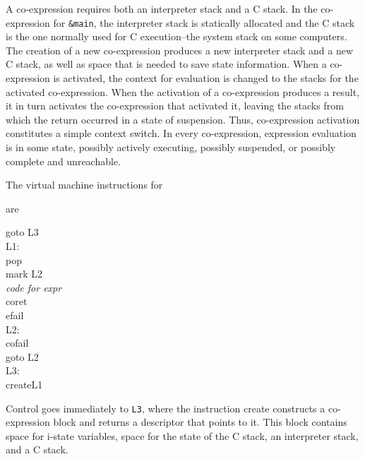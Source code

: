 A co-expression requires both an interpreter stack and a C stack. In
the co-expression for \texttt{\&main}, the interpreter stack is
statically allocated and the C stack is the one normally used for C
execution--the {\textquotedbl}system stack{\textquotedbl} on some
computers. The creation of a new co-expression produces a new
interpreter stack and a new C stack, as well as space that is needed
to save state information. When a co-expression is activated, the
context for evaluation is changed to the stacks for the activated
co-expression. When the activation of a co-expression produces a
result, it in turn activates the co-expression that activated it,
leaving the stacks from which the return occurred in a state of
suspension. Thus, co-expression activation constitutes a simple
context switch.  In every co-expression, expression evaluation is in
some state, possibly actively executing, possibly suspended, or
possibly complete and unreachable.


The virtual machine instructions for


are

\begin{iconcode}
\>\>goto\>\>\>\> L3\\
L1:\\
\>\>pop\\
\>\>mark\>\>\>\> L2\\
\>\>\textit{code for expr}\\
\>\>coret\\
\>\>efail\\
L2:\\
\>\>cofail\\
\>\>goto\>\>\>\> L2\\
L3:\\
\>\>create\>\>\>\>L1
\end{iconcode}

Control goes immediately to \texttt{L3}, where the instruction create
constructs a co-expression block and returns a descriptor that points
to it. This block contains space for i-state variables, space for the
state of the C stack, an interpreter stack, and a C stack.

